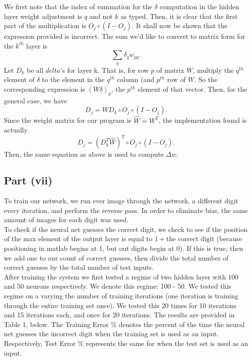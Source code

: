 \documentclass[12pt]{article}
\begin{document}
We first note that the index of summation for the $\delta$ computation in the hidden layer weight adjustment is $q$ and not $k$ as typed.
Then, it is clear that the first part of the multiplication is $O_j\circ (I-O_j)$.
It shall now be shown that the expression provided is incorrect.
The sum we'd like to convert to matrix form for the $k^{th}$ layer is 
\[\sum_{q}\delta_q w_{pq}.\]
Let $D_k$ be all $delta$'s for layer k.
That is, for row $p$ of matrix $W$, multiply the $q^{th}$ element of $\delta$ to the element in the $q^{th}$ column (and $p^{th}$ row of $W$.
So the corresponding expression is $(W\delta)_p$, the $p^{th}$ element of that vector.
Then, for the general case, we have \[D_j = WD_k \circ O_j\circ (I-O_j).\]
Since the weight matrix for our program is $\hat W =W^T$, the implementation found is actually 
\[D_j = (D_k^T\hat W)^T\circ O_j\circ (I-O_j).\]
Then, the same equation as above is used to compute \(\Delta w\).
\subsection*{Part (vii)}
To train our network, we run ever image through the network, a different digit every iteration, and perform the reverse pass.
In order to eliminate bias, the same amount of images for each digit was used.\\
To check if the neural net guesses the correct digit, we check to see if the position of the max element of the output layer is equal to $1+\text{the correct digit}$ (because positioning in matlab begins at 1, but out digits begin at 0). If this is true, then we add one to our count of correct guesses, then divide the total number of correct guesses by the total number of test inputs.\\
After training the system we first tested a regime of two hidden layer with 100 and 50 neurons respectively. We denote this regime: 100 - 50. We tested this regime on a varying the number of training iterations (one iteration is training through the entire training set once). We tested this 20 times for 10 iterations and 15 iterations each, and once for 20 iterations. The results are provided in Table 1, below. The Training Error \% denotes the percent of the time the neural net guesses the incorrect digit when the training set is used as an input. Respectively, Test Error \% represents the same for when the test set is used as an input.
\end{document}
